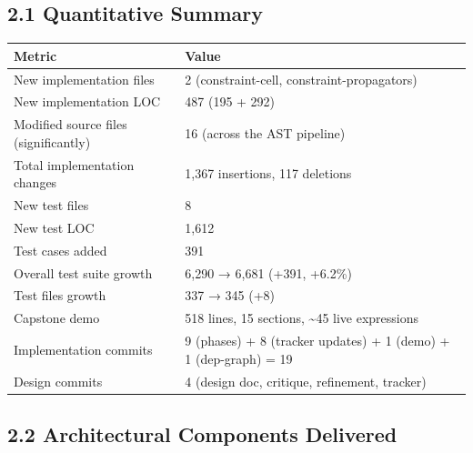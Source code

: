 \documentclass[11pt]{article}
\begin{document}
\subsection{2.1 Quantitative Summary}
\label{sec:org8665a8d}

\begin{center}
\begin{tabular}{ll}
Metric & Value\\
\hline
New implementation files & 2 (constraint-cell, constraint-propagators)\\
New implementation LOC & 487 (195 + 292)\\
Modified source files (significantly) & 16 (across the AST pipeline)\\
Total implementation changes & 1,367 insertions, 117 deletions\\
New test files & 8\\
New test LOC & 1,612\\
Test cases added & 391\\
Overall test suite growth & 6,290 → 6,681 (+391, +6.2\%)\\
Test files growth & 337 → 345 (+8)\\
Capstone demo & 518 lines, 15 sections, \textasciitilde{}45 live expressions\\
Implementation commits & 9 (phases) + 8 (tracker updates) + 1 (demo) + 1 (dep-graph) = 19\\
Design commits & 4 (design doc, critique, refinement, tracker)\\
\end{tabular}
\end{center}
\subsection{2.2 Architectural Components Delivered}
\label{sec:org5174898}
\end{document}
